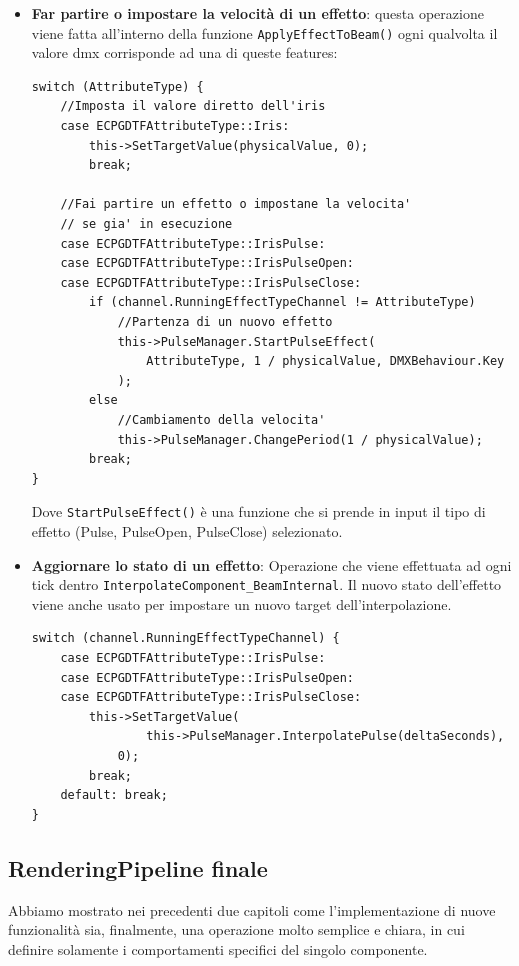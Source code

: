 \documentclass[main.tex]{subfiles}
\begin{document}
\begin{itemize}
    \item \textbf{Far partire o impostare la velocità di un effetto}: questa operazione viene fatta all'interno della funzione \lstinline{ApplyEffectToBeam()} ogni qualvolta il valore dmx corrisponde ad una di queste features:
\clearpage
    \begin{lstlisting}
switch (AttributeType) {
    //Imposta il valore diretto dell'iris
	case ECPGDTFAttributeType::Iris:
		this->SetTargetValue(physicalValue, 0);
		break;

    //Fai partire un effetto o impostane la velocita'
    // se gia' in esecuzione
	case ECPGDTFAttributeType::IrisPulse:
	case ECPGDTFAttributeType::IrisPulseOpen:
	case ECPGDTFAttributeType::IrisPulseClose:
		if (channel.RunningEffectTypeChannel != AttributeType) 
            //Partenza di un nuovo effetto
            this->PulseManager.StartPulseEffect(
                AttributeType, 1 / physicalValue, DMXBehaviour.Key
            );
		else
            //Cambiamento della velocita'
            this->PulseManager.ChangePeriod(1 / physicalValue);
		break;
}
\end{lstlisting}
    Dove \lstinline{StartPulseEffect()} è una funzione che si prende in input il tipo di effetto (Pulse, PulseOpen, PulseClose) selezionato.
    \item \textbf{Aggiornare lo stato di un effetto}: Operazione che viene effettuata ad ogni tick dentro \lstinline{InterpolateComponent_BeamInternal}. Il nuovo stato dell'effetto viene anche usato per impostare un nuovo target dell'interpolazione.
    \begin{lstlisting}
switch (channel.RunningEffectTypeChannel) {
    case ECPGDTFAttributeType::IrisPulse:
    case ECPGDTFAttributeType::IrisPulseOpen:
    case ECPGDTFAttributeType::IrisPulseClose:
        this->SetTargetValue(
                this->PulseManager.InterpolatePulse(deltaSeconds),
            0);
        break;
    default: break;
}
\end{lstlisting}
\end{itemize}
\clearpage
\subsection{RenderingPipeline finale}\label{subsec:5_final}
Abbiamo mostrato nei precedenti due capitoli come l'implementazione di nuove funzionalità sia, finalmente, una operazione molto semplice e chiara, in cui definire solamente i comportamenti specifici del singolo componente.
\end{document}
